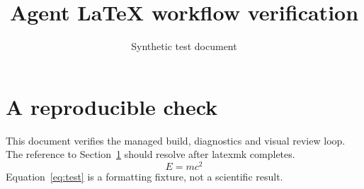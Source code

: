 \documentclass{article}
\title{Agent LaTeX workflow verification}
\author{Synthetic test document}
\begin{document}
\maketitle
\section{A reproducible check}\label{sec:check}
This document verifies the managed build, diagnostics and visual review loop.
The reference to Section~\ref{sec:check} should resolve after latexmk completes.
\begin{equation}\label{eq:test}
  E = mc^2
\end{equation}
Equation~\ref{eq:test} is a formatting fixture, not a scientific result.
\end{document}
